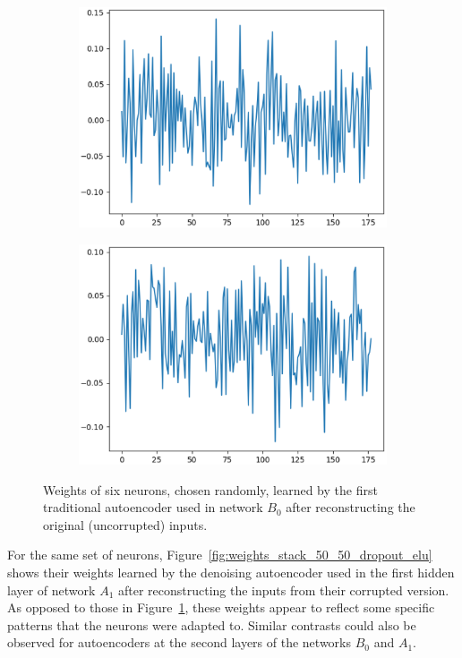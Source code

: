\documentclass[12pt]{article}
\begin{document}
\begin{figure}
\begin{subfigure}{.5\textwidth}
  \centering
  \includegraphics[width=.8\linewidth]{figures/stack_50_50_dropout_elu_clean_input/weights_neuron_4.eps}
\end{subfigure}
\begin{subfigure}{.5\textwidth}
  \centering
  \includegraphics[width=.8\linewidth]{figures/stack_50_50_dropout_elu_clean_input/weights_neuron_8.eps}
\end{subfigure}
\caption{Weights of six neurons, chosen randomly, learned by the first traditional autoencoder used in network $B_0$ after reconstructing the original (uncorrupted) inputs.}
\label{fig:weights_stack_50_50_dropout_elu_clean_input}
\end{figure}

For the same set of neurons, Figure~\ref{fig:weights_stack_50_50_dropout_elu} shows their weights learned by the denoising autoencoder used in the first hidden layer of network $A_1$ after reconstructing the inputs from their corrupted version. As opposed to those in Figure~\ref{fig:weights_stack_50_50_dropout_elu_clean_input}, these weights appear to reflect some specific patterns that the neurons were adapted to. Similar contrasts could also be observed for autoencoders at the second layers of the networks $B_0$ and $A_1$.
\end{document}

